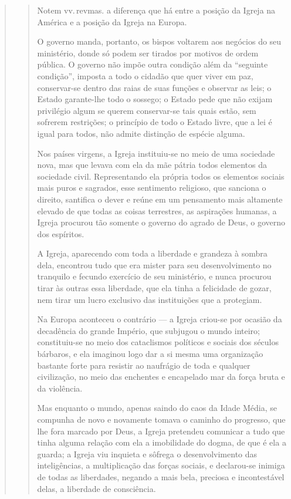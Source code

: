 \begin{quote}
\begin{quote}
Notem vv.\,revmas. a diferença que há entre a posição da Igreja na
América e a posição da Igreja na Europa.

O governo manda, portanto, os bispos voltarem aos negócios do seu
ministério, donde só podem ser tirados por motivos de ordem pública. O
governo não impõe outra condição além da ``seguinte condição'', imposta a
todo o cidadão que quer viver em paz, conservar-se dentro das raias de
suas funções e observar as leis; o Estado garante-lhe todo o sossego; o
Estado pede que não exijam privilégio algum se querem conservar-se tais
quais estão, sem sofrerem restrições; o princípio de todo o Estado
livre, que a lei é igual para todos, não admite distinção de espécie
alguma.

Nos países virgens, a Igreja instituiu-se no meio de uma sociedade nova,
mas que levava com ela da mãe pátria todos elementos da sociedade civil.
Representando ela própria todos os elementos sociais mais puros e
sagrados, esse sentimento religioso, que sanciona o direito, santifica o
dever e reúne em um pensamento mais altamente elevado de que todas as
coisas terrestres, as aspirações humanas, a Igreja procurou tão somente
o governo do agrado de Deus, o governo dos espíritos.

A Igreja, aparecendo com toda a liberdade e grandeza à sombra dela,
encontrou tudo que era mister para seu desenvolvimento no tranquilo e
fecundo exercício de seu ministério, e nunca procurou tirar às outras
essa liberdade, que ela tinha a felicidade de gozar, nem tirar um lucro
exclusivo das instituições que a protegiam.

Na Europa aconteceu o contrário --- a Igreja criou-se por ocasião da
decadência do grande Império, que subjugou o mundo inteiro;
constituiu-se no meio dos cataclismos políticos e sociais dos séculos
bárbaros, e ela imaginou logo dar a si mesma uma organização bastante
forte para resistir ao naufrágio de toda e qualquer civilização, no meio
das enchentes e encapelado mar da força bruta e da violência.

Mas enquanto o mundo, apenas saindo do caos da Idade Média, se compunha
de novo e novamente tomava o caminho do progresso, que lhe fora marcado
por Deus, a Igreja pretendeu comunicar a tudo que tinha alguma relação
com ela a imobilidade do dogma, de que é ela a guarda; a Igreja viu
inquieta e sôfrega o desenvolvimento das inteligências, a multiplicação
das forças sociais, e declarou-se inimiga de todas as liberdades,
negando a mais bela, preciosa e incontestável delas, a liberdade de
consciência.


\end{quote}
\end{quote}
